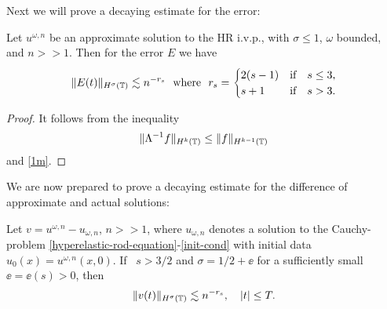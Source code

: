%
%
%
Next we will prove a decaying estimate for the error:
%
%
%
%
%                      
%
%
%
%
\begin{lemma}
\label{lem:error_of_approx_solution}
Let $u^{\omega,n}$ be an approximate solution to the HR i.v.p., with 
$\sigma \le 1$,  $\omega$ bounded, and $n >> 1$.
Then for the error $E$ we have
%
%
\begin{equation}
\label{total-error-approx-solution}
\begin{split}
\|E(t)\|_{H^\sigma(\mathbb{T})} \lesssim n^{-r_s} \ \ \text{where} \ \ r_s = 
\begin{cases}
2(s-1)   & \text{if} \quad s \le 3,\\  s+1  & \text{if} \quad s > 3. \\
\end{cases}
\end{split}
\end{equation}
%
%
%
%
\end{lemma}
%
%
%
%
%
%
%
\begin{proof} It follows from the inequality
%
%
%
%
\begin{equation*}
\begin{split}
\|\Lambda^{-1}f \|_{H^{k}(\mathbb{T})} \le
\|f\|_{H^{k-1}(\mathbb{T})}
\end{split}
\end{equation*}
and \eqref{1m}.
\end{proof}
%
%
%
%
%
%
%
%
%
%
We are now prepared to prove a decaying estimate for the difference of 
approximate and actual solutions:
%
%
\begin{proposition}
\label{prop:bound_for_difference-of-approx-actual-soln}
Let $v=u^{\omega,n} - u_{\omega,n}$, $n >>1$,
where $u_{\omega,n}$ denotes a solution to
the Cauchy-problem \eqref{hyperelastic-rod-equation}-\eqref{init-cond} with
initial data $u_0(x) = u^{\omega,n}(x,0)$.
If \ $s > 3/2 $ and $\sigma = 1/2 + \ee$ for a sufficiently
small $\ee = \ee(s) > 0$, then 
%
%
\begin{equation} \label{differ-Hsigma-est} \|
v(t)
\|_{H^\sigma(\mathbb{T})}
\lesssim n^{-r_s}, \quad |t| \le T.
\end{equation}
%
%
\end{proposition}
%
%
